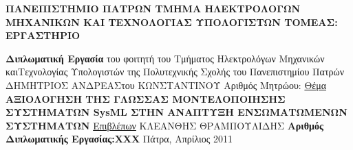\documentclass[a4paper,12pt,twoside]{report}
\newcommand{ \FirstName}{ΔΗΜΗΤΡΙΟΣ ΑΝΔΡΕΑΣ}
\newcommand{ \FathersName}{ΚΩΝΣΤΑΝΤΙΝΟΥ}
\newcommand{ \AM}{5657}
\newcommand{ \ThesisTitle}{ΑΞΙΟΛΟΓΗΣΗ ΤΗΣ ΓΛΩΣΣΑΣ ΜΟΝΤΕΛΟΠΟΙΗΣΗΣ ΣΥΣΤΗΜΑΤΩΝ SysML ΣΤΗΝ ΑΝΑΠΤΥΞΗ ΕΝΣΩΜΑΤΩΜΕΝΩΝ ΣΥΣΤΗΜΑΤΩΝ}
\newcommand{ \FirstProfessor}{ΚΛΕΑΝΘΗΣ ΘΡΑΜΠΟΥΛΙΔΗΣ}
\newcommand{ \ThesisNumber}{ΧΧΧ}
\newcommand{ \Month}{Απρίλιος}
\newcommand{ \Year}{2011}
\begin{document}
	\cleardoublepage
	\label{Πρώτη σελίδα}
		\begin{flushleft}
			\textbf{
				{\large ΠΑΝΕΠΙΣΤΗΜΙΟ ΠΑΤΡΩΝ} \linebreak
				{\normalsize ΤΜΗΜΑ ΗΛΕΚΤΡΟΛΟΓΩΝ ΜΗΧΑΝΙΚΩΝ \linebreak ΚΑΙ ΤΕΧΝΟΛΟΓΙΑΣ ΥΠΟΛΟΓΙΣΤΩΝ}\linebreak
				{\small ΤΟΜΕΑΣ:}\linebreak
				{\footnotesize ΕΡΓΑΣΤΗΡΙΟ }
			}
		\end{flushleft}
		\hrulefill
	
		\begin{center}
			\textbf{{\LARGE Διπλωματική Εργασία}}\linebreak
			{\large του φοιτητή του Τμήματος Ηλεκτρολόγων Μηχανικών και\linebreak 	Τεχνολογίας Υπολογιστών της Πολυτεχνικής Σχολής του \linebreak Πανεπιστημίου Πατρών}
			\linebreak \linebreak \linebreak
			{\large  \FirstName\space του \FathersName}
			\linebreak \linebreak
			{\large Αριθμός Μητρώου:\linebreak \AM}
			\linebreak \linebreak  \linebreak
			{\large \underline{Θέμα}}
			\linebreak  \linebreak
			{\Large \textbf{ \ThesisTitle}}
			\linebreak \linebreak \linebreak
			{\large \underline{Επιβλέπων}}
			\linebreak  \linebreak
			{\large \FirstProfessor}
			\linebreak \linebreak \linebreak \linebreak
			{\large \textbf{Αριθμός Διπλωματικής Εργασίας:\linebreak \ThesisNumber}}
			\linebreak \linebreak
			{\large Πάτρα, \Month \hspace{1pt} \Year}
		\end{center}
 
\end{document}
